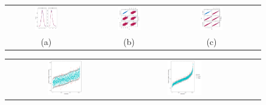 	\begin{figure} [ht!]
		\centering
		\begin{tabular}{cccc}
			\includegraphics[width=0.3\textwidth]{plots/densitycase3} &
			\includegraphics[width=0.3\textwidth]{plots/scattercase3hm} &
			\includegraphics[width=0.3\textwidth]{plots/scattercase3wm} \\
			\textnormal{(a)}  & \textnormal{(b)} & \textnormal{(c)}  \\[6pt]
		\end{tabular}
		\begin{tabular}{cccc}
			\includegraphics[width=0.3\textwidth]{plots/distributioncase3hm} &
			\includegraphics[width=0.3\textwidth]{plots/distributioncase3wm} \\

\end{tabular}
\end{figure}

